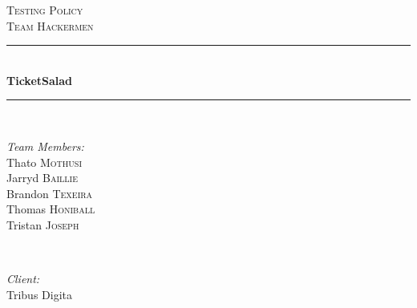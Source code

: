 \documentclass[12pt]{article}
\begin{document}
	
	\begin{titlepage}
	
	\newcommand{\HRule}{\rule{\linewidth}{0.5mm}} %
	
	\center %
	 
	
	\textsc{\LARGE Testing Policy}\\[0.5cm] %
	\textsc{\Large Team Hackermen}\\[0.5cm] %
	
	
	
	\HRule \\[0.4cm]
	{ \huge \bfseries TicketSalad}\\[0.4cm] %
	\HRule \\[1.5cm]
	 
	
	\begin{minipage}{0.4\textwidth}
	\begin{flushleft} \large
	\emph{Team Members:}\\%
	Thato \textsc{Mothusi}\\
	Jarryd \textsc{Baillie}\\
	Brandon \textsc{Texeira}\\
	Thomas \textsc{Honiball}\\
	Tristan \textsc{Joseph}\\
	\end{flushleft}
	\end{minipage}
	~
	\begin{minipage}{0.4\textwidth}
	\begin{flushright} \large
	\emph{Client:} \\
	Tribus Digita %
	\end{flushright}
	\end{minipage}\\[2cm]
	

\end{titlepage}
\end{document}
